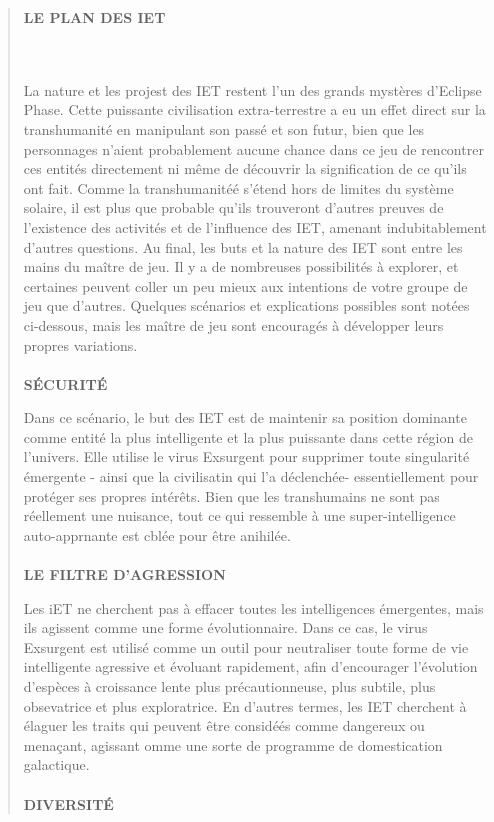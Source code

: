 \begin{quotation} \begin{large}\textbf{ LE PLAN DES IET} \end{large} \\ \\ La nature et les projest des IET restent l'un des grands mystères d'Eclipse Phase. Cette puissante civilisation extra-terrestre a eu un effet direct sur la transhumanité en manipulant son passé et son futur, bien que les personnages n'aient probablement aucune chance dans ce jeu de rencontrer ces entités directement ni même de découvrir la signification de ce qu'ils ont fait. Comme la transhumanitéé s'étend hors de limites du système solaire, il est plus que probable qu'ils trouveront d'autres preuves de l'existence des activités et de l'influence des IET, amenant indubitablement d'autres questions. Au final, les buts et la nature des IET sont entre les mains du maître de jeu. Il y a de nombreuses possibilités à explorer, et certaines peuvent coller un peu mieux aux intentions de votre groupe de jeu que d'autres. Quelques scénarios et explications possibles sont notées ci-dessous, mais les maître de jeu sont encouragés à développer leurs propres variations. \\ \\ \textbf{SÉCURITÉ} 

Dans ce scénario, le but des IET est de maintenir sa position dominante comme entité la plus intelligente et la plus puissante dans cette région de l'univers. Elle utilise le virus Exsurgent pour supprimer toute singularité émergente - ainsi que la civilisatin qui l'a déclenchée- essentiellement pour protéger ses propres intérêts. Bien que les transhumains ne sont pas réellement une nuisance, tout ce qui ressemble à une super-intelligence auto-apprnante est cblée pour être anihilée. \\ \\ \textbf{LE FILTRE D'AGRESSION} 

Les iET ne cherchent pas à effacer toutes les intelligences émergentes, mais ils agissent comme une forme évolutionnaire. Dans ce cas, le virus Exsurgent est utilisé comme un outil pour neutraliser toute forme de vie intelligente agressive et évoluant rapidement, afin d'encourager l'évolution d'espèces à croissance lente plus précautionneuse, plus subtile, plus obsevatrice et plus exploratrice. En d'autres termes, les IET cherchent à élaguer les traits qui peuvent être considéés comme dangereux ou menaçant, agissant omme une sorte de programme de domestication galactique. \\ \\ \textbf{DIVERSITÉ} 


\end{quotation}

